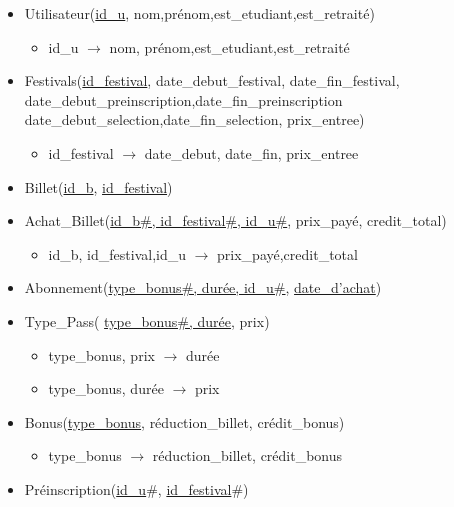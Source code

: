 \documentclass{article}
\begin{document}
  
\begin{itemize}
    \item Utilisateur(\underline{id\_u}, nom,prénom,est\_etudiant,est\_retraité)
    \begin{itemize}
        \item id\_u $\rightarrow$ nom, prénom,est\_etudiant,est\_retraité
    \end{itemize}
    
    \item Festivals(\underline{id\_festival},
        date\_debut\_festival, date\_fin\_festival,
        date\_debut\_preinscription,date\_fin\_preinscription
        date\_debut\_selection,date\_fin\_selection, prix\_entree)
    \begin{itemize}
        \item id\_festival $\rightarrow$ date\_debut, date\_fin, prix\_entree
    \end{itemize}
    
    \item Billet(\underline{id\_b}, \underline{id\_festival})

    \item Achat\_Billet(\underline{id\_b\#, id\_festival\#, id\_u\#}, prix\_payé, credit\_total)
    \begin{itemize}
        \item id\_b, id\_festival,id\_u $\rightarrow$ prix\_payé,credit\_total
    \end{itemize}
    
    \item Abonnement(\underline{type\_bonus\#, durée, id\_u\#}, \underline{date\_d'achat})
     
    \item Type\_Pass( \underline{type\_bonus\#, durée}, prix)
    \begin{itemize}
        \item type\_bonus, prix $\rightarrow$ durée
        \item type\_bonus, durée $\rightarrow$ prix
    \end{itemize}
    
     \item Bonus(\underline{type\_bonus}, réduction\_billet, crédit\_bonus)
     \begin{itemize}
         \item type\_bonus $\rightarrow$ réduction\_billet, crédit\_bonus
     \end{itemize}
        
     \item Préinscription(\underline{id\_u}\#, \underline{id\_festival}\#)


\end{itemize}
\end{document}
